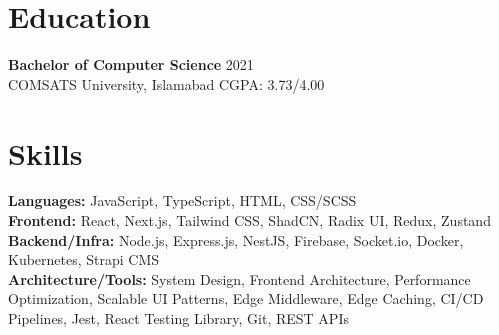 \documentclass[9pt,letterpaper]{article}
\begin{document}
\section*{Education}
\textbf{Bachelor of Computer Science} \hfill 2021 \\
COMSATS University, Islamabad \hfill CGPA: 3.73/4.00

\section*{Skills}
\textbf{Languages:} JavaScript, TypeScript, HTML, CSS/SCSS \\
\textbf{Frontend:} React, Next.js, Tailwind CSS, ShadCN, Radix UI, Redux, Zustand \\
\textbf{Backend/Infra:} Node.js, Express.js, NestJS, Firebase, Socket.io, Docker, Kubernetes, Strapi CMS \\
\textbf{Architecture/Tools:} System Design, Frontend Architecture, Performance Optimization, Scalable UI Patterns, Edge Middleware, Edge Caching, CI/CD Pipelines, Jest, React Testing Library, Git, REST APIs
\end{document}
